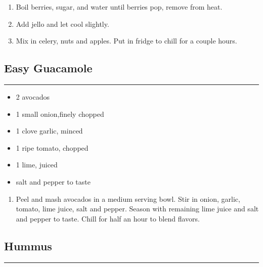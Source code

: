 \documentclass{article}
\begin{document}
\begin{enumerate}
    \item 
        Boil berries, sugar, and water until berries pop, remove from heat.
    \item 
        Add jello and let cool slightly.
    \item 
        Mix in celery, nuts and apples. Put in fridge to chill for a couple hours.
\end{enumerate}
\newpage

\subsection{Easy Guacamole} 
\noindent\rule[0.5ex]{\linewidth}{1pt}

\begin{framed}
\begin{itemize}
    \item 2 avocados
    \item 1 small onion,finely chopped
    \item 1 clove garlic, minced
    \item 1 ripe tomato, chopped
    \item 1 lime, juiced
    \item salt and pepper to taste
\end{itemize}
\end{framed}

\begin{enumerate}
    \item 
        Peel and mash avocados in a medium serving bowl. Stir in onion, garlic, tomato, lime juice, salt and pepper. Season with remaining lime juice and salt and pepper to taste. Chill for half an hour to blend flavors.
\end{enumerate}
\newpage

\subsection{Hummus} 
\noindent\rule[0.5ex]{\linewidth}{1pt}
\end{document}
